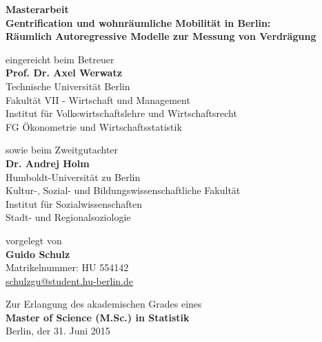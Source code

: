 \begin{center}
    {\normalsize{\bf Masterarbeit}} \\\vspace{0.5cm}
    {\large{\bf Gentrification und wohnräumliche Mobilität in Berlin: \\
                Räumlich Autoregressive Modelle zur Messung von Verdrägung}} \vspace{1.0cm}

    {\normalsize eingereicht beim Betreuer}\\\vspace{0.5cm}
    {\normalsize{\bf Prof. Dr. Axel Werwatz}} \\\vspace{0.5cm}
    {\normalsize Technische Universität Berlin \\
    Fakultät VII - Wirtschaft und Management \\
    Institut für Volkswirtschaftslehre und Wirtschaftsrecht \\
    FG Ökonometrie und Wirtschaftsstatistik} \vspace{1cm}

    {\normalsize sowie beim Zweitgutachter}\\\vspace{0.5cm}
    {\normalsize{\bf Dr. Andrej Holm}} \\\vspace{0.5cm}
    {\normalsize Humboldt-Universität zu Berlin \\
    Kultur-, Sozial- und Bildungswissenschaftliche Fakultät\\
    Institut für Sozialwissenschaften\\
    Stadt- und Regionalsoziologie} \vspace{1cm}

    {\normalsize vorgelegt von \\\vspace{0.5cm}
    {\bf Guido Schulz} \\
    Matrikelnummer: HU 554142 \\
    \href{mailto:schulzgu@student.hu-berlin.de}{schulzgu@student.hu-berlin.de}} \vspace{1cm}


    {\normalsize Zur Erlangung des akademischen Grades eines \\
    {\bf Master of Science (M.Sc.) in Statistik} \\
    Berlin, der 31. Juni 2015}

\end{center}
